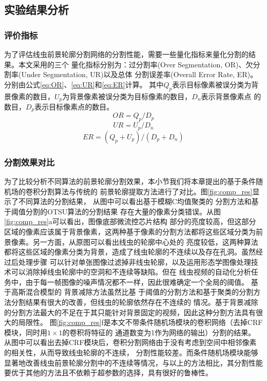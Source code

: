 \subsection{实验结果分析}
\subsubsection{评价指标}
	为了评估线虫前景轮廓分割网络的分割性能，需要一些量化指标来量化分割的结果。本文采用的三个
	量化指标分别为：过分割率(Over Segmentation, OR)、欠分割率(Under Segmentation, UR)以及总体
	分割误差率(Overall Error Rate, ER)\cite{Liu2006Set}。分别由公式\ref{eq:OR}、\ref{eq:UR}和\ref{eq:ER}计算。
	其中$Q_p$表示目标像素被误分类为背景像素的数目，$U_p$为背景像素被误分类为目标像素的数目，$D_n$表示背景像素点
	的数目，$D_p$表示目标像素点的数目。
		\begin{equation}
		OR = Q_p/D_p \label{eq:OR}
		\end{equation}
		\begin{equation}
		UR = U_p/D_n \label{eq:UR}
		\end{equation}
		\begin{equation}
		ER = (Q_p+U_p)/(D_p+D_n)\label{eq:ER}
		\end{equation}
\subsubsection{分割效果对比}
	为了比较分析不同算法的前景轮廓分割效果，本小节我们将本章提出的基于条件随机场的卷积分割算法与传统的
	前景轮廓提取方法进行了对比。图\ref{fig:comp_res}显示了不同算法的分割结果，
	从图中可以看出基于模糊C均值聚类的
	分割方法\cite{peizhuang1983pattern}和基于阈值分割的OTSU算法\cite{otsu1979threshold}的分割结果
	存在大量的像素分类错误。从图\ref{fig:comp_res}a可以看出，图像底部微流控芯片结构
	部分的亮度较高，但这部分区域的像素应该属于背景像素，这两种基于像素的分割方法都将这些区域分类为前景像素。另一方面，从原图可以看出线虫的轮廓中心处的
	亮度较低，这两种算法都将这些区域的像素分类为背景，造成了线虫轮廓的不连续以及存在孔洞。虽然经过后处理步骤
	可以针对单张图像过滤掉非线虫轮廓，以及运用形态学图像处理技术可以消除掉线虫轮廓中的空洞和不连续等缺陷。但在
	线虫视频的自动化分析任务中，由于每一帧图像的噪声情况都不一样，因此很难确定一个全局的阈值。 基于高斯混合模型的
	背景减除方法\cite{zivkovic2006efficient}虽然比基
	于阈值的分割方法和基于聚类的分割方法分割结果有很大的改善，但线虫的轮廓依然存在不连续的
	情况。基于背景减除的分割方法最大的不足在于其只能针对背景固定的视频，因此这种分割方法具有很大的局限性。
	图\ref{fig:comp_res}f是本文不带条件随机场模块的卷积网络（去掉CRF模块，同时用$1\times1$的卷积将特征的
	通道数变为1作为网络的输出）分割的结果。
	从图中可以看出去掉CRF模块后，卷积分割网络由于没有考虑到空间中相邻像素的相关性，从而导致线虫轮廓的不连续，
	分割性能较差。而条件随机场模块能够显著地改善线虫前景轮廓分割中的不连续等情况，与以上的方法相比，其分割性能
	要优于其他的方法且不依赖于超参数的选择，具有很好的鲁棒性。
	
